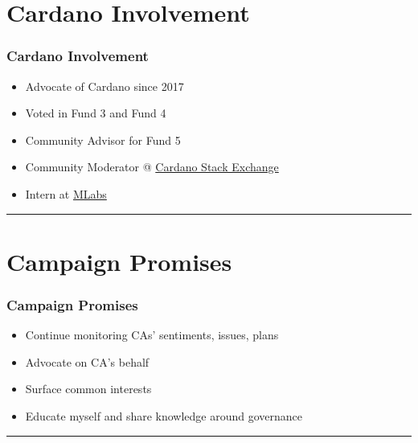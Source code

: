 \documentclass[aspectratio=169,12pt]{beamer}
\begin{document}
\section{Cardano Involvement}
\begin{frame}
    \frametitle{Cardano Involvement}
	\begin{minipage}{0.47\textwidth}
		\begin{itemize}
            \item Advocate of Cardano since 2017
            \item Voted in Fund 3 and Fund 4
            \item Community Advisor for Fund 5
            \item Community Moderator @ \href{https://cardano.stackexchange.com/}{Cardano Stack Exchange}
            \item Intern at \href{https://mlabs.city/}{MLabs}
		\end{itemize}
	\end{minipage}
	\begin{minipage}{0.5\textwidth}
		\rule{\textwidth}{0.75\textwidth}
	\end{minipage}
\end{frame}

\section{Campaign Promises}
\begin{frame}
    \frametitle{Campaign Promises}
	\begin{minipage}{0.47\textwidth}
		\begin{itemize}
            \item Continue monitoring CAs' sentiments, issues, plans
            \item Advocate on CA's behalf
            \item Surface common interests
            \item Educate myself and share knowledge around governance
		\end{itemize}
	\end{minipage}
	\begin{minipage}{0.5\textwidth}
		\rule{\textwidth}{0.75\textwidth}
	\end{minipage}
\end{frame}
\end{document}
